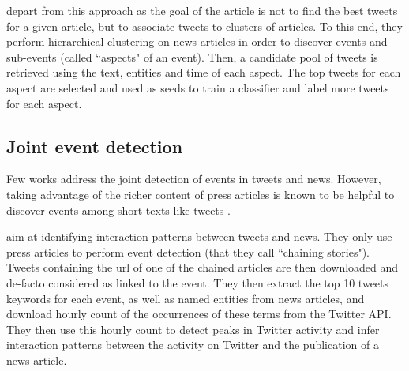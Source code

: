 \cite{wang_mining_2015} depart from this approach as the goal of the article is not to find the best tweets for a given article, but to associate tweets to clusters of articles. To this end, they perform hierarchical clustering on news articles in order to discover events and sub-events (called ``aspects" of an event). Then, a candidate pool of tweets is retrieved using the text, entities and time of each aspect. The top tweets for each aspect are selected and used as seeds to train a classifier and label more tweets for each aspect.


\subsection{Joint event detection}
\label{Joint event detection}
Few works address the joint detection of events in tweets and news. However, taking advantage of the richer content of press articles is known to be helpful to discover events among short texts like tweets \citep{phan_2008_learning}.  

\cite{ning_uncovering_2015} aim at identifying interaction patterns between tweets and news. They only use press articles to perform event detection (that they call ``chaining stories"). Tweets containing the url of one of the chained articles are then downloaded and de-facto considered as linked to the event. They then extract the top 10 tweets keywords for each event, as well as named entities from news articles, and download hourly count of the occurrences of these terms from the Twitter API. They then use this hourly count to detect peaks in Twitter activity and infer interaction patterns between the activity on Twitter and the publication of a news article.

